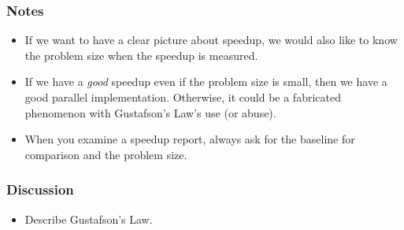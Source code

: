 \documentclass{beamer}
\begin{document}
\begin{CJK}{UTF8}{bsmi}
\begin{frame}
\frametitle{Notes}
\begin{itemize}
\item If we want to have a clear picture about speedup, we would also like to know the problem size when the speedup is measured.
\item If we have a {\em good} speedup even if the problem size is small, then we have a good parallel implementation.  
Otherwise, it could be a fabricated phenomenon with Gustafson's Law's use (or abuse).
\item When you examine a speedup report, always ask for the baseline for comparison and the problem size.
\end{itemize}
\end{frame}

\begin{frame}
\frametitle{Discussion}
\begin{itemize}
\item Describe Gustafson's Law.
\end{itemize}
\end{frame}

\end{CJK}
\end{document}
